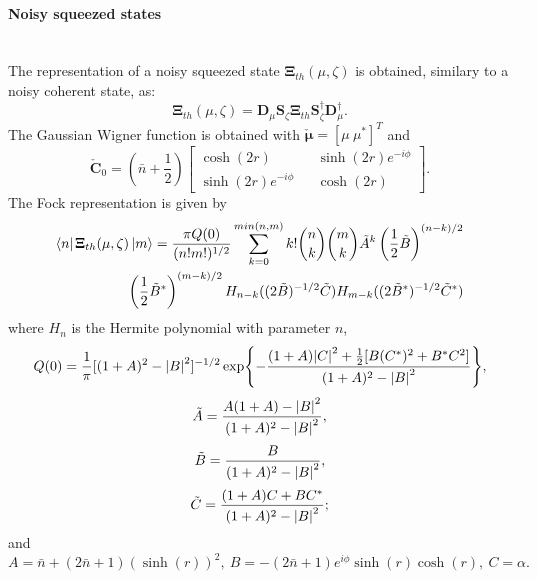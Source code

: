     \paragraph{Noisy squeezed states}\mbox{} \\
    The representation of a noisy squeezed state $\pmb{\Xi}_{th}(\mu,\zeta)$ is obtained,
    similary to a noisy coherent state, as:
    \begin{equation}
        \pmb{\Xi}_{th}(\mu,\zeta)=\pmb{D}_\mu\pmb{S}_\zeta\pmb{\Xi}_{th}
        \pmb{S}_\zeta^\dagger\pmb{D}_\mu^\dagger.
    \end{equation}
    The Gaussian Wigner function is obtained with $\check{\pmb{\mu}}=[\mu\ \mu^*]^T$ and
    \begin{equation*}
        \check{\pmb{C}}_0=\left(\bar{n}+\frac{1}{2}\right)
        \begin{bmatrix}
            \cosh(2r) && \sinh(2r)e^{-i\phi}\\
            \sinh(2r)e^{-i\phi} && \cosh(2r)
        \end{bmatrix}.
    \end{equation*}
    The Fock representation is given by \cite{MarMar_1993}
    \begin{equation}\begin{split}
        \bra{n}\pmb{\Xi}_{th}(\mu,\zeta)\ket{m}=\frac{\pi Q(0)}{(n!m!)^{1/2}}
        \sum_{k=0}^{min(n,m)} k! \binom{n}{k}\binom{m}{k} \tilde{A}^k\left(\frac{1}{2}
        \tilde{B}\right)^{(n-k)/2}\\ \left(\frac{1}{2}\tilde{B}^*\right)^{(m-k)/2}
        H_{n-k}((2\tilde{B})^{-1/2}\tilde{C}) H_{m-k}((2\tilde{B}^*)^{-1/2}\tilde{C}^*) 
        \label{FR_NSS}
    \end{split}\end{equation}
    where $H_n$ is the Hermite polynomial with parameter $n$,
    \begin{equation*}
        Q(0)=\frac{1}{\pi}[(1+A)^2-\absolutevalue{B}^2]^{-1/2}\exp{-\frac{(1+A)\absolutevalue{C}^2
        +\frac{1}{2}[B(C^*)^2+B^*C^2]}{(1+A)^2-\absolutevalue{B}^2}},
    \end{equation*} 
    \begin{equation*}
        \tilde{A}=\frac{A(1+A)-\absolutevalue{B}^2}{(1+A)^2-\absolutevalue{B}^2},
    \end{equation*}
    \begin{equation*}
        \tilde{B}=\frac{B}{(1+A)^2-\absolutevalue{B}^2},
    \end{equation*}
    \begin{equation*}
        \tilde{C}=\frac{(1+A)C+BC^*}{(1+A)^2-\absolutevalue{B}^2};
    \end{equation*}
    and
    \begin{equation*}
        A=\bar{n}+(2\bar{n}+1)(\sinh(r))^2,\ 
        B=-(2\bar{n}+1)e^{i\phi}\sinh(r)\cosh(r),\ 
        C=\alpha.
    \end{equation*}

